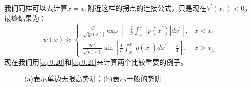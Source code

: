 \documentclass[a4paper,zihao=-4,linespread=1]{ctexrep}
\begin{document}
    我们同样可以去计算$x=x_1$附近这样的拐点的连接公式，只是现在$V^\prime(x_1)<0$，最终结果为：
    \begin{equation}
        \label{eq:9.21}
        \psi(x) \approx\left\{\begin{array}{ll}
            \frac{C^{\prime}}{\sqrt{|p(x)|}} \exp \left[-\frac{1}{\hbar} \int_{x}^{x_{1}}\left|p\left(x^{\prime}\right)\right| d x^{\prime}\right], & x<x_{1} \\
            \frac{2 C^{\prime}}{\sqrt{p(x)}} \sin \left[\frac{1}{\hbar} \int_{x_{1}}^{x} p\left(x^{\prime}\right) d x^{\prime}+\frac{\pi}{4}\right], & x>x_{1}
            \end{array}\right.
    \end{equation}
    现在我们用\ref{eq:9.20}和\ref{eq:9.21}来计算两个比较重要的例子。

    \begin{figure}[h]
        \centering
        \quad
        \label{fig:9.4}
        \caption{(a)表示单边无限高势阱；(b)表示一般的势阱}
    \end{figure}
\end{document}

